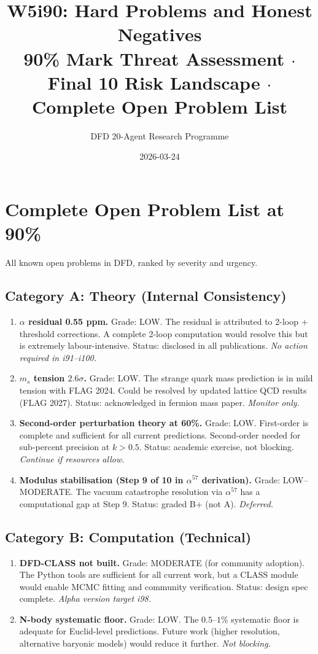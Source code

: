 \documentclass[11pt,a4paper]{article}
\title{W5i90: Hard Problems and Honest Negatives\\[6pt]
\large 90\% Mark Threat Assessment $\cdot$ Final 10 Risk Landscape $\cdot$ Complete Open Problem List}
\author{DFD 20-Agent Research Programme}
\date{2026-03-24}
\begin{document}
\maketitle

\section{Complete Open Problem List at 90\%}

All known open problems in DFD, ranked by severity and urgency.

\subsection{Category A: Theory (Internal Consistency)}

\begin{enumerate}[nosep]
\item \textbf{$\alpha$ residual 0.55 ppm.} Grade: LOW. The residual is attributed to 2-loop + threshold corrections. A complete 2-loop computation would resolve this but is extremely labour-intensive. Status: disclosed in all publications. \emph{No action required in i91--i100.}

\item \textbf{$m_s$ tension $2.6\sigma$.} Grade: LOW. The strange quark mass prediction is in mild tension with FLAG 2024. Could be resolved by updated lattice QCD results (FLAG 2027). Status: acknowledged in fermion mass paper. \emph{Monitor only.}

\item \textbf{Second-order perturbation theory at 60\%.} Grade: LOW. First-order is complete and sufficient for all current predictions. Second-order needed for sub-percent precision at $k > 0.5$. Status: academic exercise, not blocking. \emph{Continue if resources allow.}

\item \textbf{Modulus stabilisation (Step 9 of 10 in $\alpha^{57}$ derivation).} Grade: LOW--MODERATE. The vacuum catastrophe resolution via $\alpha^{57}$ has a computational gap at Step 9. Status: graded B+ (not A). \emph{Deferred.}
\end{enumerate}

\subsection{Category B: Computation (Technical)}

\begin{enumerate}[nosep]
\item \textbf{DFD-CLASS not built.} Grade: MODERATE (for community adoption). The Python tools are sufficient for all current work, but a CLASS module would enable MCMC fitting and community verification. Status: design spec complete. \emph{Alpha version target i98.}

\item \textbf{N-body systematic floor.} Grade: LOW. The $0.5$--$1\%$ systematic floor is adequate for Euclid-level predictions. Future work (higher resolution, alternative baryonic models) would reduce it further. \emph{Not blocking.}
\end{enumerate}
\end{document}
